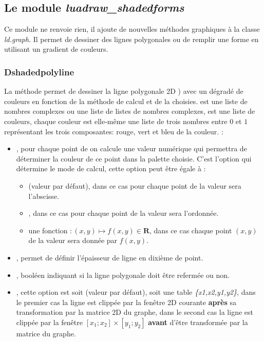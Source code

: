 \subsection{Le module \emph{luadraw\_shadedforms}}

Ce module ne renvoie rien, il ajoute de nouvelles méthodes graphiques à la classe \emph{ld.graph}. Il permet de dessiner des lignes polygonales ou de remplir une forme en utilisant un gradient de couleurs.

\subsubsection{Dshadedpolyline}

La méthode  permet de dessiner la ligne polygonale 2D ) avec un dégradé de couleurs en fonction de la méthode de calcul et de la  choisies.  est une liste de nombres complexes ou une liste de listes de nombres complexes,  est une liste de couleurs, chaque couleur est elle-même une liste de trois nombres entre $0$ et $1$ représentant les trois composantes: rouge, vert et bleu de la couleur. \writeoptions :
\begin{itemize}
    \item {}, pour chaque point de  on calcule une valeur numérique qui permettra de déterminer la couleur de ce point dans la palette choisie. C'est l'option  qui détermine le mode de calcul, cette option peut être égale à : 
        \begin{itemize}
            \item {} (valeur par défaut), dans ce cas pour chaque point de  la valeur sera l'abscisse. 
            \item {}, dans ce cas pour chaque point de  la valeur sera l'ordonnée. 
            \item une fonction $\colon(x,y)\mapsto f(x,y)\in\mathbf R$, dans ce cas chaque point $(x,y)$ de  la valeur sera donnée par $f(x,y)$.
        \end{itemize}
    \item {}, permet de définir l'épaisseur de ligne en dixième de point.
    \item {}, booléen indiquant si la ligne polygonale doit être refermée ou non.
    \item {}, cette option est soit \nil (valeur par défaut), soit une table \emph{\{x1,x2,y1,y2\}}, dans le premier cas la ligne est clippée par la fenêtre 2D courante \textbf{après} sa transformation par la matrice 2D du graphe, dans le second cas la ligne est clippée par la fenêtre $[x_1;x_2]\times[y_1;y_2]$ \textbf{avant} d'être transformée par la matrice du graphe.
\end{itemize}

